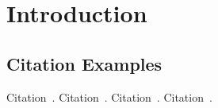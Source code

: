 
\chapter{Introduction}\label{chapter:introduction}

\section{Citation Examples}
Citation~\parencite{latex}.
Citation~\parencite{rfc-9000}.
Citation~\parencite{draft-moqtransport}.
Citation~\parencite{article-quic-usage}.




